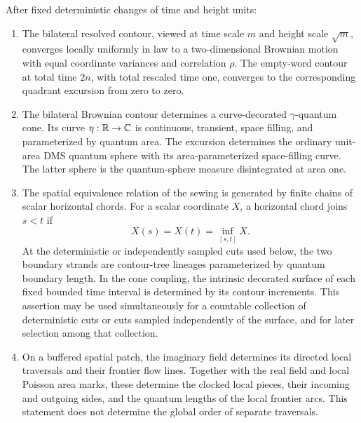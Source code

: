 \begin{theorem}\label{bg:continuum-inputs}
After fixed deterministic changes of time and height units:
\begin{enumerate}[label=(\roman*)]
\item The bilateral resolved contour, viewed at time scale \(m\) and height scale \(\sqrt m\), converges locally uniformly in law to a two-dimensional Brownian motion with equal coordinate variances and correlation \(\rho\). The empty-word contour at total time \(2n\), with total rescaled time one, converges to the corresponding quadrant excursion from zero to zero.
\item The bilateral Brownian contour determines a curve-decorated \(\gamma\)-quantum cone. Its curve \(\eta:\mathbb R\to\mathbb C\) is continuous, transient, space filling, and parameterized by quantum area. The excursion determines the ordinary unit-area DMS quantum sphere with its area-parameterized space-filling curve. The latter sphere is the quantum-sphere measure disintegrated at area one.
\item The spatial equivalence relation of the sewing is generated by finite chains of scalar horizontal chords. For a scalar coordinate \(X\), a horizontal chord joins \(s<t\) if
\[
 X(s)=X(t)=\inf_{[s,t]}X.
\]
At the deterministic or independently sampled cuts used below, the two boundary strands are contour-tree lineages parameterized by quantum boundary length. In the cone coupling, the intrinsic decorated surface of each fixed bounded time interval is determined by its contour increments. This assertion may be used simultaneously for a countable collection of deterministic cuts or cuts sampled independently of the surface, and for later selection among that collection.
\item On a buffered spatial patch, the imaginary field determines its directed local traversals and their frontier flow lines. Together with the real field and local Poisson area marks, these determine the clocked local pieces, their incoming and outgoing sides, and the quantum lengths of the local frontier arcs. This statement does not determine the global order of separate traversals.
\end{enumerate}
\end{theorem}
